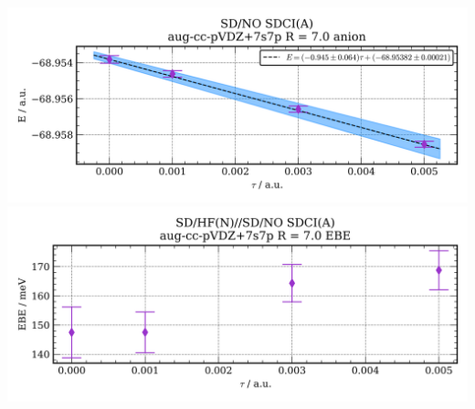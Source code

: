 \includegraphics[width=\textwidth,keepaspectratio]{images/SDshivHFupaNapushivshivSDshivNO_SDCIupaAapu__aug-cc-pvdz+7s7p__7p0_02_anion.png}
\includegraphics[width=\textwidth,keepaspectratio]{images/SDshivHFupaNapushivshivSDshivNO_SDCIupaAapu__aug-cc-pvdz+7s7p__7p0_03_ebe.png}
